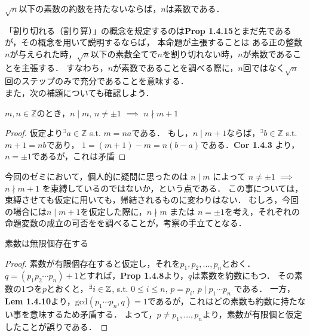     \begin{prop}
      $\sqrt{n}$以下の素数の約数を持たないならば，$n$は素数である．
    \end{prop}

    「割り切れる（割り算）」の概念を規定するのは\textbf{Prop 1.4.15}とまだ先であるが，その概念を用いて説明するならば，
    本命題が主張することは ある正の整数$n$が与えられた時，$\sqrt{n}$以下の素数全てで$n$を割り切れない時，$n$が素数であることを主張する．
    すなわち，$n$が素数であることを調べる際に，$n$回ではなく$\sqrt{n}$回のステップのみで充分であることを意味する． \\

    また，次の補題についても確認しよう．

    \begin{lem}
      $m, n \in \mathbb{Z}$のとき，$n \mid m$, $n \neq \pm 1$ $\implies$ $n \nmid m + 1$
    \end{lem}

    \begin{proof}
      仮定より$^{\exists}a \in \mathbb{Z}$ s.t. $m = na$である．
      もし，$n \mid m+1$ならば，$^{\exists}b \in \mathbb{Z}$ s.t. $m+1 = nb$であり，
      $1 = (m+1)-m = n(b-a)$である．\textbf{Cor 1.4.3} より，$n = \pm 1$であるが，これは矛盾
    \end{proof}

    今回のゼミにおいて，個人的に疑問に思ったのは $n \mid m$ によって $n \neq \pm 1$ $\implies$ $n \nmid m + 1$ を束縛しているのではないか，という点である．
    この事については，束縛させても仮定に用いても，帰結されるものに変わりはない．
    むしろ，今回の場合には$n \mid m+1$を仮定した際に，$n \nmid m$ または $n = \pm 1$を考え，それぞれの命題変数の成立の可否をを調べることが，考察の手立てとなる．

    \begin{prop}
      素数は無限個存在する
    \end{prop}

    \begin{proof}
      素数が有限個存在すると仮定し，それを$p_1, p_2, ... , p_n $とおく．
      $q=(p_1 p_2 \cdots p_n) + 1$とすれば，\textbf{Prop 1.4.8}より，$q$は素数を約数にもつ．
      その素数の1つを$p$とおくと，$^{\exists}i \in \mathbb{Z}$, s.t. $0 \leq i \leq n$, $p = p_i$, $p \mid p_1 \cdots p_n$ である．
      一方，\textbf{Lem 1.4.10}より，$\mathrm{gcd} (p_1 \cdots p_n, q)=1$であるが，これはどの素数も約数に持たない事を意味するため矛盾する．
      よって，$p \neq p_1, ... , p_n$より，素数が有限個と仮定したことが誤りである．
    \end{proof}

